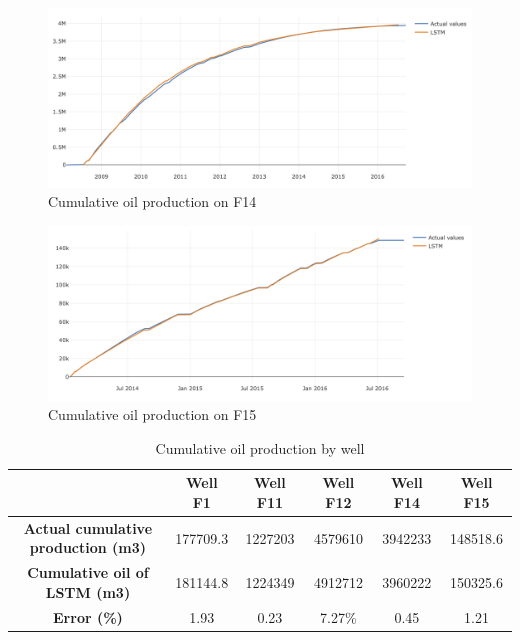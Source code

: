 \documentclass[12pt,a4paper]{report}
\begin{document}
\begin{figure}[H]
  \centering
  \includegraphics[width=\linewidth]{Cumulative/F14}
  \caption{Cumulative oil production on F14}
\end{figure}

\begin{figure}[H]
  \centering
  \includegraphics[width=\linewidth]{Cumulative/F15}
  \caption{Cumulative oil production on F15}
\end{figure}

\begin{table}[H]
\caption{Cumulative oil production by well}
\centering
\begin{adjustbox}{width=1\textwidth}
\small
\begin{tabular}{|c|c|c|c|c|c|}
\hline
\textbf{}                                  & \textbf{Well F1} & \textbf{Well F11} & \textbf{Well F12} & \textbf{Well F14} & \textbf{Well F15} \\ \hline
\textbf{Actual cumulative production (m3)} & 177709.3         & 1227203           & 4579610           & 3942233           & 148518.6          \\ \hline
\textbf{Cumulative oil of LSTM (m3)}       & 181144.8         & 1224349           & 4912712           & 3960222           & 150325.6          \\ \hline
\textbf{Error (\%)}                        & 1.93             & 0.23              & 7.27\%            & 0.45              & 1.21              \\ \hline
\end{tabular}
\end{adjustbox}
\end{table}
\end{document}
